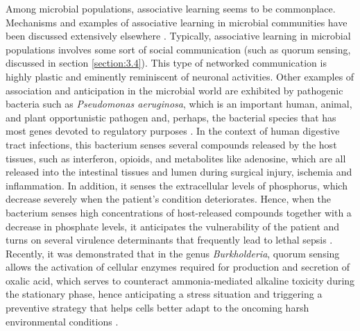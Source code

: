 Among microbial populations, associative learning seems to be commonplace. Mechanisms and examples of associative learning in microbial communities have been discussed extensively elsewhere \cite{ben_jacob_bacterial_2004,xavier_social_2011}. Typically, associative learning in microbial populations involves some sort of social communication (such as quorum sensing, discussed in section \ref{section:3.4}). This type of networked communication is highly plastic and eminently reminiscent of neuronal activities. Other examples of association and anticipation in the microbial world are exhibited by pathogenic bacteria such as \textit{Pseudomonas aeruginosa}, which is an important human, animal, and plant opportunistic pathogen and, perhaps, the bacterial species that has most genes devoted to regulatory purposes \cite{stover_complete_2000}. In the context of human digestive tract infections, this bacterium senses several compounds released by the host tissues, such as interferon, opioids, and metabolites like adenosine, which are all released into the intestinal tissues and lumen during surgical injury, ischemia and inflammation. In addition, it senses the extracellular levels of phosphorus, which decrease severely when the patient’s condition deteriorates. Hence, when the bacterium senses high concentrations of host-released compounds together with a decrease in phosphate levels, it anticipates the vulnerability of the patient and turns on several virulence determinants that frequently lead to lethal sepsis \cite{zaborin_red_2009}. Recently, it was demonstrated that in the genus \textit{Burkholderia}, quorum sensing allows the activation of cellular enzymes required for production and secretion of oxalic acid, which serves to counteract ammonia-mediated alkaline toxicity during the stationary phase, hence anticipating a stress situation and triggering a preventive strategy that helps cells better adapt to the oncoming harsh environmental conditions \cite{goo_bacterial_2012}.

